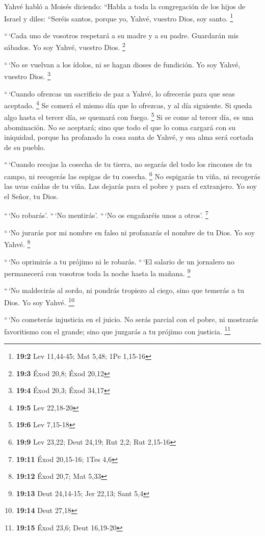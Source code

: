 \begin{paracol}{2}
 Yahvé habló a Moisés diciendo:  ``Habla a
toda la congregación de los hijos de Israel y diles: ``Seréis santos,
porque yo, Yahvé, vuestro Dios, soy santo. \footnote{\textbf{19:2} Lev
  11,44-45; Mat 5,48; 1Pe 1,15-16}

 ``\,`Cada uno de vosotros respetará a su madre y a su
padre. Guardarán mis sábados. Yo soy Yahvé, vuestro Dios. \footnote{\textbf{19:3}
  Éxod 20,8; Éxod 20,12}

 ``\,`No se vuelvan a los ídolos, ni se hagan dioses de
fundición. Yo soy Yahvé, vuestro Dios. \footnote{\textbf{19:4} Éxod
  20,3; Éxod 34,17}

 ``\,`Cuando ofrezcas un sacrificio de paz a Yahvé, lo
ofrecerás para que seas aceptado. \footnote{\textbf{19:5} Lev 22,18-20}
 Se comerá el mismo día que lo ofrezcas, y al día
siguiente. Si queda algo hasta el tercer día, se quemará con fuego.
\footnote{\textbf{19:6} Lev 7,15-18}  Si se come al tercer
día, es una abominación. No se aceptará;  sino que todo el
que lo coma cargará con su iniquidad, porque ha profanado la cosa santa
de Yahvé, y esa alma será cortada de su pueblo.

 ``\,`Cuando recojas la cosecha de tu tierra, no segarás
del todo los rincones de tu campo, ni recogerás las espigas de tu
cosecha. \footnote{\textbf{19:9} Lev 23,22; Deut 24,19; Rut 2,2; Rut
  2,15-16}  No espigarás tu viña, ni recogerás las uvas
caídas de tu viña. Las dejarás para el pobre y para el extranjero. Yo
soy el Señor, tu Dios.

 ``\,`No robarás'. ``\,`No mentirás'. ``\,`No os
engañaréis unos a otros'. \footnote{\textbf{19:11} Éxod 20,15-16; 1Tes
  4,6}

 ``\,`No jurarás por mi nombre en falso ni profanarás el
nombre de tu Dios. Yo soy Yahvé. \footnote{\textbf{19:12} Éxod 20,7; Mat
  5,33}

 ``\,`No oprimirás a tu prójimo ni le robarás. ``\,`El
salario de un jornalero no permanecerá con vosotros toda la noche hasta
la mañana. \footnote{\textbf{19:13} Deut 24,14-15; Jer 22,13; Sant 5,4}

 ``\,`No maldecirás al sordo, ni pondrás tropiezo al
ciego, sino que temerás a tu Dios. Yo soy Yahvé. \footnote{\textbf{19:14}
  Deut 27,18}

 ``\,`No cometerás injusticia en el juicio. No serás
parcial con el pobre, ni mostrarás favoritismo con el grande; sino que
juzgarás a tu prójimo con justicia. \footnote{\textbf{19:15} Éxod 23,6;
  Deut 16,19-20}


\end{paracol}
